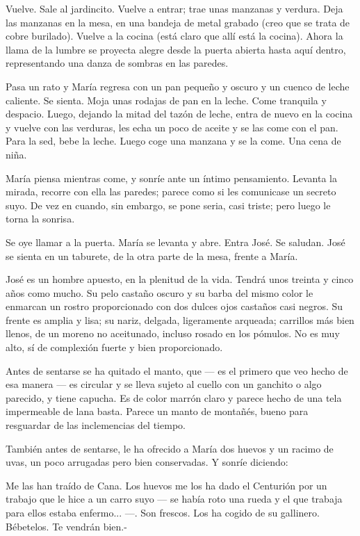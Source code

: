 \documentclass[12pt]{book} %
\begin{document}
Vuelve. Sale al jardincito. Vuelve a entrar; trae unas manzanas y verdura. Deja las manzanas en la mesa, en una bandeja de metal grabado (creo que se trata de cobre burilado). Vuelve a la cocina (está claro que allí está la cocina). Ahora la llama de la lumbre se proyecta alegre desde la puerta abierta hasta aquí dentro, representando una danza de sombras en las paredes. 

Pasa un rato y María regresa con un pan pequeño y oscuro y un cuenco de leche caliente. Se sienta. Moja unas rodajas de pan en la leche. Come tranquila y despacio. Luego, dejando la mitad del tazón de leche, entra de nuevo en la cocina y vuelve con las verduras, les echa un poco de aceite y se las come con el pan. Para la sed, bebe la leche. Luego coge una manzana y se la come. Una cena de niña. 

María piensa mientras come, y sonríe ante un íntimo pensamiento. Levanta la mirada, recorre con ella las paredes; parece como si les comunicase un secreto suyo. De vez en cuando, sin embargo, se pone seria, casi triste; pero luego le torna la sonrisa. 

Se oye llamar a la puerta. María se levanta y abre. Entra José. Se saludan. José se sienta en un taburete, de la otra parte de la mesa, frente a María. 

José es un hombre apuesto, en la plenitud de la vida. Tendrá unos treinta y cinco años como mucho. Su pelo castaño oscuro y su barba del mismo color le enmarcan un rostro proporcionado con dos dulces ojos castaños casi negros. Su frente es amplia y lisa; su nariz, delgada, ligeramente arqueada; carrillos más bien llenos, de un moreno no aceitunado, incluso rosado en los pómulos. No es muy alto, sí de complexión fuerte y bien proporcionado. 

Antes de sentarse se ha quitado el manto, que — es el primero que veo hecho de esa manera — es circular y se lleva sujeto al cuello con un ganchito o algo parecido, y tiene capucha. Es de color marrón claro y parece hecho de una tela impermeable de lana basta. Parece un manto de montañés, bueno para resguardar de las inclemencias del tiempo. 

También antes de sentarse, le ha ofrecido a María dos huevos y un racimo de uvas, un poco arrugadas pero bien conservadas. Y sonríe diciendo: 

Me las han traído de Cana. Los huevos me los ha dado el Centurión por un trabajo que le hice a un carro suyo — se había roto una rueda y el que trabaja para ellos estaba enfermo... —. Son frescos. Los ha cogido de su gallinero. Bébetelos. Te vendrán bien.- 
\end{document}

